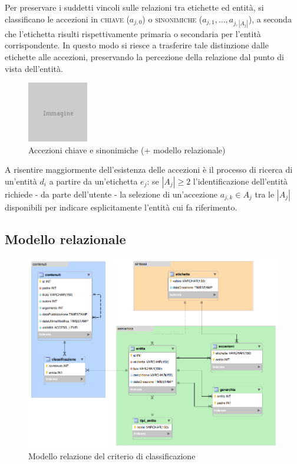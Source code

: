Per preservare i suddetti vincoli sulle relazioni tra etichette ed entità, si classificano le accezioni in \textsc{chiave} ($a_{j,0}$) o \textsc{sinonimiche} ($a_{j,1},\ldots,a_{j,\left|A_j\right|}$), a seconda che l'etichetta risulti rispettivamente primaria o secondaria per l'entità corrispondente. In questo modo si riesce a trasferire tale distinzione dalle etichette alle accezioni, preservando la percezione della relazione dal punto di vista dell'entità.

\begin{figure}[ht]
	\begin{center}
		\includegraphics{placeholder.png}
		\caption{Accezioni chiave e sinonimiche (+ modello relazionale)}
		\label{fig:tesi:stage:classificazione:entita-etichette}
	\end{center}
\end{figure}

A risentire maggiormente dell'esistenza delle accezioni è il processo di ricerca di un'entità $d_i$ a partire da un'etichetta $e_j$: se $\left|A_j\right|\geq 2$ l'identificazione dell'entità richiede - da parte dell'utente - la selezione di un'accezione $a_{j,k} \in A_j$ tra le $\left|A_j\right|$ disponibili per indicare esplicitamente l'entità cui fa riferimento.

\subsection{Modello relazionale}

\begin{figure}[ht]
	\begin{center}
		\includegraphics[width=14.7cm]{modello-er.png}
		\caption{Modello relazione del criterio di classificazione}
		\label{fig:tesi:stage:er:modello}
	\end{center}
\end{figure}

